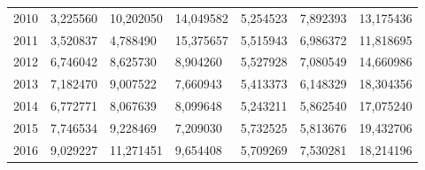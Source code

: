 \begin{table}
\begin{tabular}{p{1cm}p{2cm}p{2cm}p{2cm}p{2cm}p{2cm}p{2cm}}
 2010 &                 3,225560 & 10,202050 &                                    14,049582 &                                     5,254523 &                       7,892393 & 13,175436 \\
 2011 &                 3,520837 &  4,788490 &                                    15,375657 &                                     5,515943 &                       6,986372 & 11,818695 \\
 2012 &                 6,746042 &  8,625730 &                                     8,904260 &                                     5,527928 &                       7,080549 & 14,660986 \\
 2013 &                 7,182470 &  9,007522 &                                     7,660943 &                                     5,413373 &                       6,148329 & 18,304356 \\
 2014 &                 6,772771 &  8,067639 &                                     8,099648 &                                     5,243211 &                       5,862540 & 17,075240 \\
 2015 &                 7,746534 &  9,228469 &                                     7,209030 &                                     5,732525 &                       5,813676 & 19,432706 \\
 2016 &                 9,029227 & 11,271451 &                                     9,654408 &                                     5,709269 &                       7,530281 & 18,214196 \\
\bottomrule
\end{tabular}
\end{table}
